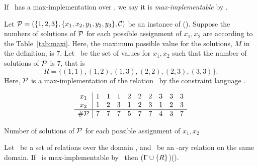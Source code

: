 If \mR\ has a max-implementation over \mrelset, we say it is \emph{max-implementable} by \mrelset\@.

\begin{example}
Let \(\mathcal{P} = (\{1,2,3\}, \{x_1,x_2,y_1,y_2,y_3\}, \mathcal{C})\) be an instance
of \ccsp(\mrelset)\@. Suppose the numbers of solutions of \(\mathcal{P}\) for each possible
assignment of \(x_1, x_2\) are according to the Table~\ref{tab:maxi}\@.
Here, the maximum possible value for the solutions, \(M\) in the definition, is 7.
Let \mR\ be the set of values for \(x_1,x_2\) such that
the number of solutions of \(\mathcal{P}\) is 7, that is 
\[R = \{(1,1), (1,2), (1,3), (2,2), (2,3), (3,3)\}.\]
Here, \(\mathcal{P}\) is a max-implementation of the relation \mR\ by the constraint language 
\mrelset\@.
\begin{table}
\begin{eqnarray*}
\begin{array}{c|ccccccccc}
x_1 & 1 & 1 & 1 & 2 & 2 & 2 & 3 & 3 & 3\\
x_2 & 1 & 2 & 3 & 1 & 2 & 3 & 1 & 2 & 3\\
\hline
\#\mathcal{P} & 7 & 7 & 7 & 5 & 7 & 7 & 4 & 3 & 7\\ 
\end{array}
\end{eqnarray*}
\caption{Number of solutions of \ensuremath{\probi} for each possible assignment of \ensuremath{x_1,x_2}}\label{tab:maxi}
\end{table}
\end{example}


\begin{theorem}[Maximization]\label{theo:max}
Let \mrelset\ be a set of relations over the domain \mD,
and \mR\ be an \mn-ary relation on the same domain. 
If \mR\ is max-implementable by \mrelset\ then \ccsp(\(\Gamma \cup \{{R}\}\))\maple\ccsp(\mrelset)\@.
\end{theorem}

